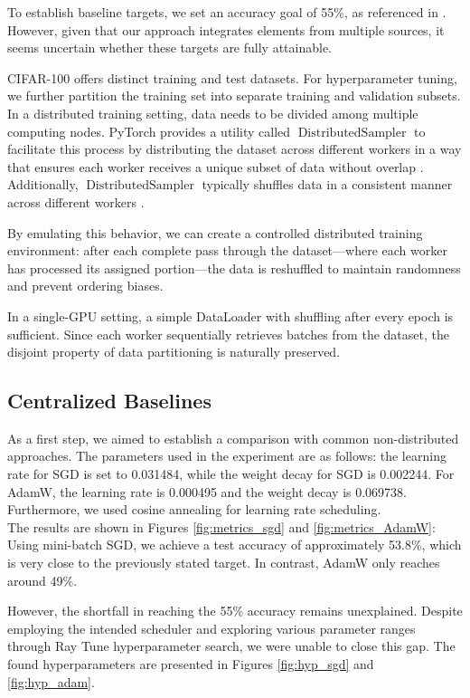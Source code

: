 \documentclass[10pt,twocolumn,letterpaper]{article}
\begin{document}
To establish baseline targets, we set an accuracy goal of 55\%, as referenced in \cite{hsu2020federatedvisualclassificationrealworld}. However, given that our approach integrates elements from multiple sources, it seems uncertain whether these targets are fully attainable.

CIFAR-100 offers distinct training and test datasets. For hyperparameter tuning, we further partition the training set into separate training and validation subsets.
In a distributed training setting, data needs to be divided among multiple computing nodes. PyTorch provides a utility called $\operatorname{DistributedSampler}$ to facilitate this process by distributing the dataset across different workers in a way that ensures each worker receives a unique subset of data without overlap \cite{pytorchData2025}. Additionally, $\operatorname{DistributedSampler}$ typically shuffles data in a consistent manner across different workers \cite{pytorchData2025}.

By emulating this behavior, we can create a controlled distributed training environment: after each complete pass through the dataset—where each worker has processed its assigned portion—the data is reshuffled to maintain randomness and prevent ordering biases.

In a single-GPU setting, a simple DataLoader with shuffling after every epoch is sufficient. Since each worker sequentially retrieves batches from the dataset, the disjoint property of data partitioning is naturally preserved.

\subsection{Centralized Baselines}\label{sec:centr_basel}
As a first step, we aimed to establish a comparison with common non-distributed approaches. The parameters used in the experiment are as follows: the learning rate for SGD is set to 0.031484, while the weight decay for SGD is 0.002244. For AdamW, the learning rate is 0.000495 and the weight decay is 0.069738. Furthermore, we used cosine annealing for learning rate scheduling.\\
The results are shown in Figures \ref{fig:metrics_sgd} and \ref{fig:metrics_AdamW}: Using mini-batch SGD, we achieve a test accuracy of approximately 53.8\%, which is very close to the previously stated target. In contrast, AdamW only reaches around 49\%.

However, the shortfall in reaching the 55\% accuracy remains unexplained. Despite employing the intended scheduler and exploring various parameter ranges through Ray Tune hyperparameter search, we were unable to close this gap. The found hyperparameters are presented in Figures \ref{fig:hyp_sgd} and \ref{fig:hyp_adam}.
\end{document}
